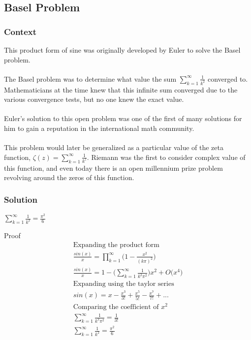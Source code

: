 \documentclass[a4paper]{article}
\begin{document}
\subsection{Basel Problem}
\label{spf:basel}
\subsubsection{Context}
This product form of sine was originally developed by Euler to solve the Basel problem. 
\\
\\
The Basel problem was to determine what value the sum $\sum_{k=1}^{\infty} \frac{1}{k^2}$ converged to. Mathematicians at the time knew that this infinite sum converged due to the various convergence tests, but no one knew the exact value. 
\\
\\
Euler's solution to this open problem was one of the first of many solutions for him to gain a reputation in the international math community.
\\
\\
This problem would later be generalized as a particular value of the zeta function, $\zeta(z) = \sum_{k=1}^{\infty} \frac{1}{k^z}$. Riemann was the first to consider complex value of this function, and even today there is an open millennium prize problem revolving around the zeros of this function. 
\subsubsection{Solution}
\begin{theorem} 
$\boxed{\sum_{k=1}^{\infty} \frac{1}{k^2} =  \frac{\pi^2}{6}}$

Proof\\
\begin{gather*}
\text{Expanding the product form }
\\
\frac{sin(x)}{x} = \prod_{k=1}^{\infty} \Big( 1-\frac{x^2}{(k\pi)^2} \Big) 
\\
\frac{sin(x)}{x} = 1 - \Big( \sum_{k=1}^{\infty} \frac{1}{k^2 \pi^2} \Big) x^2 + O\Big( x^4 \Big)
\\
\text{Expanding using the taylor series }\\
sin(x) = x - \frac{x^3}{3!} + \frac{x^5}{5!} - \frac{x^7}{7!} + ... 
\\
\text{Comparing the coefficient of } x^2 
\\
\sum_{k=1}^{\infty} \frac{1}{k^2 \pi^2} = \frac{1}{3!}
\\
\sum_{k=1}^{\infty} \frac{1}{k^2} = \frac{\pi^2}{6}
\end{gather*}
\end{theorem}
\end{document}
